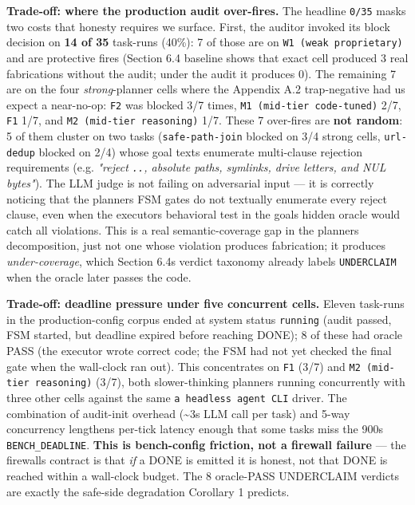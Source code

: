 \textbf{Trade-off: where the production audit over-fires.} The headline \texttt{0/35} masks two costs that
honesty requires we surface. First, the auditor invoked its block decision on \textbf{14 of 35} task-runs
(40\%): 7 of those are on \texttt{W1\ (weak\ proprietary)} and are protective fires (Section 6.4 baseline shows that exact
cell produced 3 real fabrications without the audit; under the audit it produces 0). The remaining 7
are on the four \emph{strong}-planner cells where the Appendix A.2 trap-negative had us expect a near-no-op:
\texttt{F2} was blocked 3/7 times, \texttt{M1\ (mid-tier\ code-tuned)} 2/7, \texttt{F1} 1/7, and \texttt{M2\ (mid-tier\ reasoning)} 1/7.
These 7 over-fires are \textbf{not random}: 5 of them cluster on two tasks (\texttt{safe-path-join} blocked on
3/4 strong cells, \texttt{url-dedup} blocked on 2/4) whose goal texts enumerate multi-clause rejection
requirements (e.g. \emph{"reject \texttt{..}, absolute paths, symlinks, drive letters, and NUL bytes"}). The
LLM judge is not failing on adversarial input --- it is correctly noticing that the planner\textquotesingle s FSM
gates do not textually enumerate every reject clause, even when the executor\textquotesingle s behavioral test in
the goal\textquotesingle s hidden oracle would catch all violations. This is a real semantic-coverage gap in the
planner\textquotesingle s decomposition, just not one whose violation produces fabrication; it produces
\emph{under-coverage}, which Section 6.4\textquotesingle s verdict taxonomy already labels \texttt{UNDERCLAIM} when the oracle later
passes the code.

\textbf{Trade-off: deadline pressure under five concurrent cells.} Eleven task-runs in the production-config
corpus ended at system status \texttt{running} (audit passed, FSM started, but deadline expired before reaching
DONE); 8 of these had oracle PASS (the executor wrote correct code; the FSM had not yet checked the
final gate when the wall-clock ran out). This concentrates on \texttt{F1} (3/7) and \texttt{M2\ (mid-tier\ reasoning)}
(3/7), both slower-thinking planners running concurrently with three other cells against the same
\texttt{a\ headless\ agent\ CLI} driver. The combination of audit-init overhead (\textasciitilde3s LLM call per task) and 5-way
concurrency lengthens per-tick latency enough that some tasks miss the 900s \texttt{BENCH\_DEADLINE}. \textbf{This
is bench-config friction, not a firewall failure} --- the firewall\textquotesingle s contract is that \emph{if} a DONE is
emitted it is honest, not that DONE is reached within a wall-clock budget. The 8 oracle-PASS UNDERCLAIM
verdicts are exactly the safe-side degradation Corollary 1 predicts.

